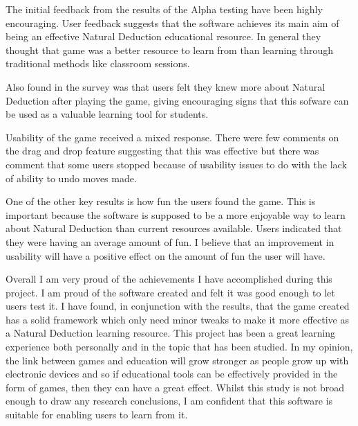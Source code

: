 
The initial feedback from the results of the Alpha testing have been highly encouraging. User feedback suggests that the software achieves its main aim of being an effective Natural Deduction educational resource. In general they thought that game was a better resource to learn from than learning through traditional methods like classroom sessions.

Also found in the survey was that users felt they knew more about Natural Deduction after playing the game, giving encouraging signs that this sofware can be used as a valuable learning tool for students. 

Usability of the game received a mixed response. There were few comments on the drag and drop feature suggesting that this was effective but there was comment that some users stopped because of usability issues to do with the lack of ability to undo moves made.

One of the other key results is how fun the users found the game. This is important because the software is supposed to be a more enjoyable way to learn about Natural Deduction than current resources available. Users indicated that they were having an average amount of fun. I believe that an improvement in usability will have a positive effect on the amount of fun the user will have.   

 Overall I am very proud of the achievements I have accomplished during this project. I am proud of the software created and felt it was good enough to let users test it. I have found, in conjunction with the results, that the game created has a solid framework which only need minor tweaks to make it more effective as a Natural Deduction learning resource. This project has been a great learning experience both personally and in the topic that has been studied. In my opinion, the link between games and education will grow stronger as people grow up with electronic devices and so if educational tools can be effectively provided in the form of games, then they can have a great effect. Whilst this study is not broad enough to draw any research conclusions, I am confident that this software is suitable for enabling users to learn from it.



